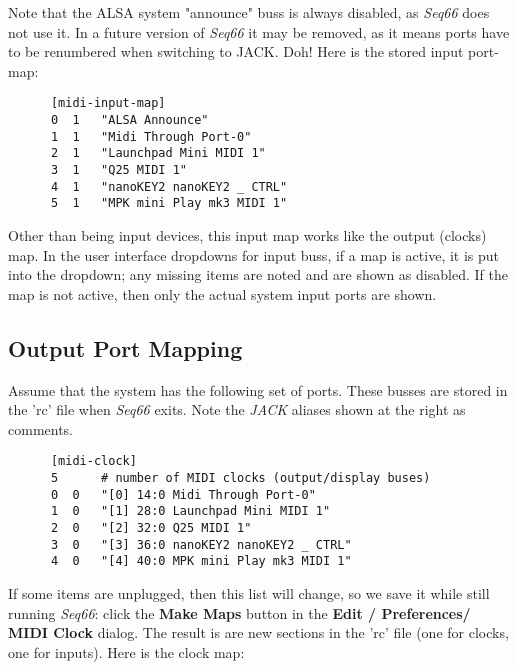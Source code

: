    Note that the ALSA system "announce" buss is always disabled,
   as \textsl{Seq66} does not use it.
   In a future version of \textsl{Seq66} it may be removed, as it means ports
   have to be renumbered when switching to JACK. Doh!
   Here is the stored input port-map:

   \begin{verbatim}
      [midi-input-map]
      0  1   "ALSA Announce"
      1  1   "Midi Through Port-0"
      2  1   "Launchpad Mini MIDI 1"
      3  1   "Q25 MIDI 1"
      4  1   "nanoKEY2 nanoKEY2 _ CTRL"
      5  1   "MPK mini Play mk3 MIDI 1"
   \end{verbatim}

   Other than being input devices, this input map works like the output
   (clocks) map.
   In the user interface dropdowns for input buss, if a map is active, it is
   put into the dropdown; any missing items are noted and are shown as
   disabled.
   If the map is not active, then only the actual system input ports are shown.

\subsection{Output Port Mapping}
\label{subsec:output_port_mapping}

   Assume that the system has the following set of ports.  These busses are
   stored in the 'rc' file when \textsl{Seq66} exits.  Note the \textsl{JACK}
   aliases shown at the right as comments.

   \begin{verbatim}
      [midi-clock]
      5      # number of MIDI clocks (output/display buses)
      0  0   "[0] 14:0 Midi Through Port-0"
      1  0   "[1] 28:0 Launchpad Mini MIDI 1"
      2  0   "[2] 32:0 Q25 MIDI 1"
      3  0   "[3] 36:0 nanoKEY2 nanoKEY2 _ CTRL"
      4  0   "[4] 40:0 MPK mini Play mk3 MIDI 1"
   \end{verbatim}


   If some items are unplugged, then this list will change, so we save it while
   still running \textsl{Seq66}:
   click the
   \textbf{Make Maps} button in the
   \textbf{Edit / Preferences/ MIDI Clock} dialog. 
   The result is are new sections in the 'rc' file (one for clocks, one for
   inputs).  Here is the clock map:

